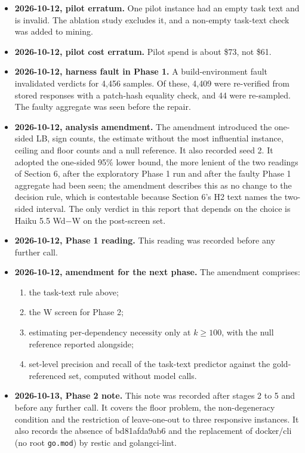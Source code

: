 \begin{itemize}
\item \textbf{2026-10-12, pilot erratum.} One pilot instance had an empty task text and is invalid. The ablation study excludes it, and a non-empty task-text check was added to mining.
\item \textbf{2026-10-12, pilot cost erratum.} Pilot spend is about \$73, not \$61.
\item \textbf{2026-10-12, harness fault in Phase 1.} A build-environment fault invalidated verdicts for 4,456 samples. Of these, 4,409 were re-verified from stored responses with a patch-hash equality check, and 44 were re-sampled. The faulty aggregate was seen before the repair.
\item \textbf{2026-10-12, analysis amendment.} The amendment introduced the one-sided LB, sign counts, the estimate without the most influential instance, ceiling and floor counts and a null reference. It also recorded seed 2. It adopted the one-sided 95\% lower bound, the more lenient of the two readings of Section 6, after the exploratory Phase 1 run and after the faulty Phase 1 aggregate had been seen; the amendment describes this as no change to the decision rule, which is contestable because Section 6's H2 text names the two-sided interval. The only verdict in this report that depends on the choice is Haiku 5.5 Wd$-$W on the post-screen set.
\item \textbf{2026-10-12, Phase 1 reading.} This reading was recorded before any further call.
\item \textbf{2026-10-12, amendment for the next phase.} The amendment comprises:
  \begin{enumerate}
  \item[(i)] the task-text rule above;
  \item[(ii)] the W screen for Phase 2;
  \item[(iii)] estimating per-dependency necessity only at $k \geq 100$, with the null reference reported alongside;
  \item[(iv)] set-level precision and recall of the task-text predictor against the gold-referenced set, computed without model calls.
  \end{enumerate}
\item \textbf{2026-10-13, Phase 2 note.} This note was recorded after stages 2 to 5 and before any further call. It covers the floor problem, the non-degeneracy condition and the restriction of leave-one-out to three responsive instances. It also records the absence of bd81afda9ab6 and the replacement of docker/cli (no root \texttt{go.mod}) by restic and golangci-lint.

\end{itemize}

